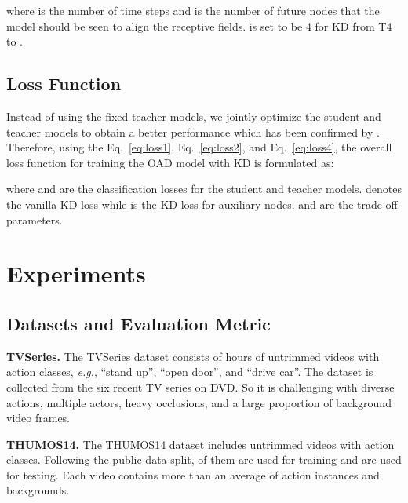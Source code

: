 \documentclass[final]{cvpr}
\begin{document}
where  is the number of time steps and  is the number of future nodes that the model should be seen to align the receptive fields.  is set to be 4 for KD from T4 to .  






















\subsection{Loss Function} 


Instead of using the fixed teacher models, we jointly optimize the student and teacher models to obtain a better performance which has been confirmed by \cite{zhang2018deep}. Therefore, using the Eq.~\eqref{eq:loss1}, Eq.~\eqref{eq:loss2}, and Eq.~\eqref{eq:loss4}, the overall loss function for training the OAD model with KD is formulated as:

where  and  are the classification losses for the student and teacher models.  denotes the vanilla KD loss while  is the KD loss for auxiliary nodes.  and  are the trade-off parameters. 







\section{Experiments}

\subsection{Datasets and Evaluation Metric}

\noindent \textbf{TVSeries.} The TVSeries dataset \cite{geest2016online} consists of  hours of  untrimmed videos with  action classes, \emph{e.g.}, ``stand up'', ``open door'', and ``drive car''. The dataset is collected from the six recent TV series on DVD. So it is challenging with diverse actions, multiple actors, heavy occlusions, and a large proportion of background video frames. 

\noindent \textbf{THUMOS14.} The THUMOS14 dataset includes  untrimmed videos with  action classes. Following the public data split,  of them are used for training and  are used for testing. Each video contains more than an average of  action instances and  backgrounds.
\end{document}
